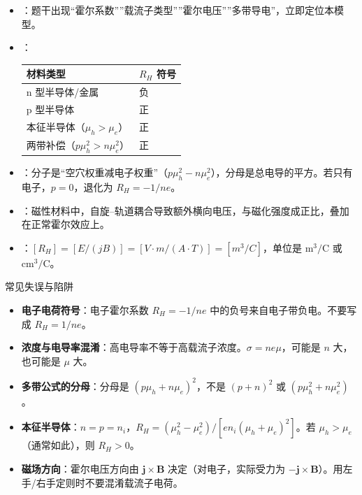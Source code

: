 \begin{tipbox}[快速识别与解题技巧]
\begin{itemize}
    \item {}：题干出现``霍尔系数''''载流子类型''''霍尔电压''''多带导电''，立即定位本模型。
    \item {}：
    \begin{center}
    \begin{tabular}{ll}
    \toprule
    \textbf{材料类型} & \textbf{$R_H$ 符号} \\
    \midrule
    n 型半导体/金属 & 负 \\
    p 型半导体 & 正 \\
    本征半导体（$\mu_h>\mu_e$） & 正 \\
    两带补偿（$p\mu_h^2>n\mu_e^2$） & 正 \\
    \bottomrule
    \end{tabular}
    \end{center}
    \item {}：分子是``空穴权重减电子权重''（$p\mu_h^2-n\mu_e^2$），分母是总电导的平方。若只有电子，$p=0$，退化为 $R_H=-1/ne$。
    \item {}：磁性材料中，自旋--轨道耦合导致额外横向电压，与磁化强度成正比，叠加在正常霍尔效应上。
    \item {}：$[R_H]=[E/(jB)]=[V\cdot m/(A\cdot T)]=[m^3/C]$，单位是 $\text{m}^3/\text{C}$ 或 $\text{cm}^3/\text{C}$。
\end{itemize}
\end{tipbox}

\begin{errorbox}{常见失误与陷阱}
\begin{itemize}
    \item \textbf{电子电荷符号}：电子霍尔系数 $R_H=-1/ne$ 中的负号来自电子带负电。不要写成 $R_H=1/ne$。
    \item \textbf{浓度与电导率混淆}：高电导率不等于高载流子浓度。$\sigma=ne\mu$，可能是 $n$ 大，也可能是 $\mu$ 大。
    \item \textbf{多带公式的分母}：分母是 $(p\mu_h+n\mu_e)^2$，不是 $(p+n)^2$ 或 $(p\mu_h^2+n\mu_e^2)$。
    \item \textbf{本征半导体}：$n=p=n_i$，$R_H=(\mu_h^2-\mu_e^2)/[en_i(\mu_h+\mu_e)^2]$。若 $\mu_h>\mu_e$（通常如此），则 $R_H>0$。
    \item \textbf{磁场方向}：霍尔电压方向由 $\mathbf{j}\times\mathbf{B}$ 决定（对电子，实际受力为 $-\mathbf{j}\times\mathbf{B}$）。用左手/右手定则时不要混淆载流子电荷。
\end{itemize}
\end{errorbox}

